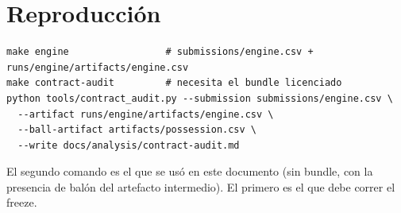 \documentclass[11pt,a4paper]{article}
\begin{document}
\section*{Reproducci\'on}

\begingroup\footnotesize
\begin{verbatim}
make engine                 # submissions/engine.csv + runs/engine/artifacts/engine.csv
make contract-audit         # necesita el bundle licenciado
python tools/contract_audit.py --submission submissions/engine.csv \
  --artifact runs/engine/artifacts/engine.csv \
  --ball-artifact artifacts/possession.csv \
  --write docs/analysis/contract-audit.md
\end{verbatim}
\endgroup

El segundo comando es el que se us\'o en este documento (sin bundle, con la presencia de bal\'on
del artefacto intermedio). El primero es el que debe correr el freeze.
\end{document}
